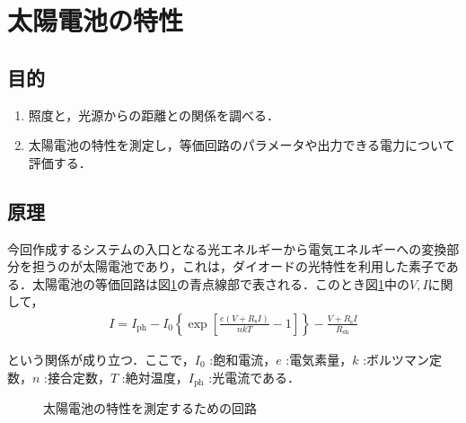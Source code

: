 \documentclass[1_power_supply.tex]{subfiles}
\begin{document}
\section{太陽電池の特性}

  \subsection{目的}

    \begin{enumerate}
      \item 照度と，光源からの距離との関係を調べる．
      \item 太陽電池の特性を測定し，等価回路のパラメータや出力できる電力について評価する．
    \end{enumerate}

  \subsection{原理}

    今回作成するシステムの入口となる光エネルギーから電気エネルギーへの変換部分を担うのが太陽電池であり，これは，ダイオードの光特性を利用した素子である．太陽電池の等価回路は図\ref{fig:1_2}の青点線部で表される．このとき図\ref{fig:1_2}中の$V,I$に関して，
    \begin{align}
      I = I_\mathrm{ph}-I_0\left\{\exp[\frac{e(V+R_\mathrm{s}I)}{nkT}-1]\right\}-\frac{V+R_\mathrm{s}I}{R_\mathrm{sh}}
    \end{align}

    という関係が成り立つ．ここで，$I_0$ :飽和電流，$e$ :電気素量，$k$ :ボルツマン定数，$n$ :接合定数，$T$ :絶対温度，$I_\mathrm{ph}$ :光電流である．


    \begin{figure}[htbp]
      \begin{center}
        \caption{太陽電池の特性を測定するための回路}\label{fig:1_2}
      \end{center}
    \end{figure}
\end{document}
